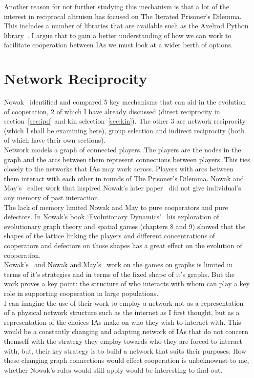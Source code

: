 \documentclass[]{final_report}
\begin{document}
Another reason for not further studying this mechanism is that a lot of the interest in reciprocal altruism has focused on The Iterated Prisoner's Dilemma. This includes a number of libraries that are available such as the Axelrod Python library~\cite{axelrodproject}. I argue that to gain a better understanding of how we can work to facilitate cooperation between IAs we must look at a wider berth of options.

\section{Network Reciprocity}
Nowak~\cite{five_rules_coop} identified and compared 5 key mechanisms that can aid in the evolution of cooperation, 2 of which I have already discussed (direct reciprocity in section~\ref{sec:ipd} and kin selection~\ref{sec:kin}). The other 3 are network reciprocity (which I shall be examining here), group selection and indirect reciprocity (both of which have their own sections).\\
Network models a graph of connected players. The players are the nodes in the graph and the arcs between them represent connections between players. This ties closely to the networks that IAs may work across. Players with arcs between them interact with each other in rounds of The Prisoner's Dilemma. Nowak and May's~\cite{spatial} ealier work that inspired Nowak's later paper~\cite{five_rules_coop} did not give individual's any memory of past interaction.\\
The lack of memory limited Nowak and May to pure cooperators and pure defectors. In Nowak's book `Evolutionary Dynamics'~\cite{nowak2006evolutionary} his exploration of evolutionary graph theory and spatial games (chapters 8 and 9) showed that the shapes of the lattice linking the players and different concentrations of cooperators and defectors on those shapes has a great effect on the evolution of cooperation.\\
Nowak's~\cite{five_rules_coop, nowak2006evolutionary} and Nowak and May's~\cite{spatial} work on the games on graphs is limited in terms of it's strategies and in terms of the fixed shape of it's graphs. But the work proves a key point: the structure of who interacts with whom can play a key role in supporting cooperation in large populations.\\
I can imagine the use of their work to employ a network not as a representation of a physical network structure such as the internet as I first thought, but as a representation of the choices IAs make on who they wish to interact with. This would be a constantly changing and adapting network of IAs that do not concern themself with the strategy they employ towards who they are forced to interact with, but, their key strategy is to build a network that suits their purposes. How these changing graph connections would effect cooperation is unbeknownst to me, whether Nowak's rules would still apply would be interesting to find out.\\
\end{document}

